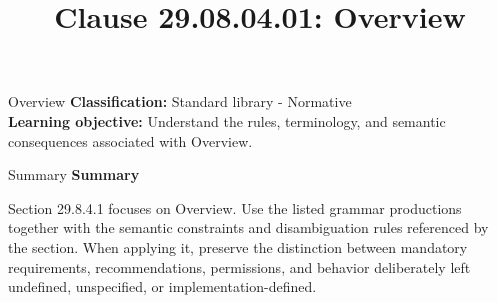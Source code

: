 \documentclass[10pt,letterpaper]{article}
\title{Clause 29.08.04.01: Overview}
\author{}
\date{}
\begin{document}
\maketitle
\begin{CornellOverviewBox}{Overview}
\textbf{Classification:} Standard library - Normative\\[2pt]
\textbf{Learning objective:} Understand the rules, terminology, and semantic consequences associated with Overview.
\end{CornellOverviewBox}\begin{CornellSummaryBox}{Summary}
{\sffamily\bfseries\color{Accent} Summary}\par\vspace{3pt}Section 29.8.4.1 focuses on Overview. Use the listed grammar productions together with the semantic constraints and disambiguation rules referenced by the section. When applying it, preserve the distinction between mandatory requirements, recommendations, permissions, and behavior deliberately left undefined, unspecified, or implementation-defined.
\end{CornellSummaryBox}
\end{document}
